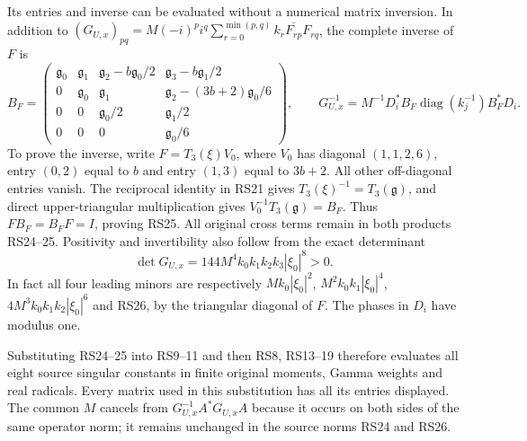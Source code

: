 \documentclass[11pt]{article}
\newcommand{\diag}{\operatorname{diag}}
\begin{document}
Its entries and inverse can be evaluated without a numerical
matrix inversion. In addition to
$(G_{U,x})_{pq}=M(-i)^p i^q
\sum_{r=0}^{\min(p,q)}k_r\overline{F_{rp}}F_{rq}$,
the complete inverse of $F$ is
\begin{equation}
 B_F=\begin{pmatrix}
 \mathfrak g_0&\mathfrak g_1&\mathfrak g_2-b\mathfrak g_0/2
                       &\mathfrak g_3-b\mathfrak g_1/2\\
 0&\mathfrak g_0&\mathfrak g_1
                       &\mathfrak g_2-(3b+2)\mathfrak g_0/6\\
 0&0&\mathfrak g_0/2&\mathfrak g_1/2\\
 0&0&0&\mathfrak g_0/6
 \end{pmatrix},\qquad
 G_{U,x}^{-1}=M^{-1}D_i^*B_F\diag(k_j^{-1})B_F^*D_i.
 \tag{RS25}
\end{equation}
To prove the inverse, write
$F=T_3(\xi)V_0$, where $V_0$ has diagonal $(1,1,2,6)$,
entry $(0,2)$ equal to $b$ and entry $(1,3)$ equal to $3b+2$.
All other off-diagonal entries vanish. The reciprocal identity
in RS21 gives $T_3(\xi)^{-1}=T_3(\mathfrak g)$, and direct
upper-triangular multiplication gives $V_0^{-1}T_3(\mathfrak g)=B_F$.
Thus $FB_F=B_FF=I$, proving RS25. All original cross terms
remain in both products RS24--25. Positivity and invertibility
also follow from the exact determinant
\begin{equation}
 \det G_{U,x}=144M^4 k_0k_1k_2k_3|\xi_0|^8>0.
 \tag{RS26}
\end{equation}
In fact all four leading minors are respectively
$Mk_0|\xi_0|^2$, $M^2k_0k_1|\xi_0|^4$,
$4M^3k_0k_1k_2|\xi_0|^6$ and RS26, by the triangular
diagonal of $F$. The phases in $D_i$ have modulus one.

Substituting RS24--25 into RS9--11 and then RS8, RS13--19
therefore evaluates all eight source singular constants in
finite original moments, Gamma weights and real radicals.
Every matrix used in this substitution has all its entries
displayed. The common $M$ cancels from $G_{U,x}^{-1}A^*G_{U,x}A$
because it occurs on both sides of the same operator norm;
it remains unchanged in the source norms RS24 and RS26.
\end{document}
